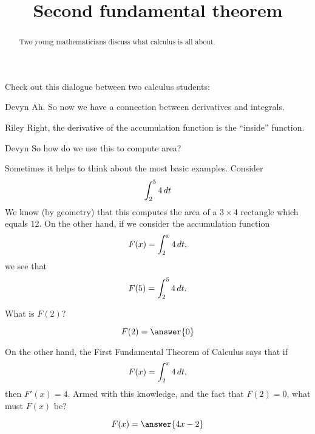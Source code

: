 \documentclass{ximera}
\title[Break-Ground:]{Second fundamental theorem}
\begin{document}
\begin{abstract}
Two young mathematicians discuss what calculus is all about.
\end{abstract}
\maketitle

Check out this dialogue between two calculus students:

\begin{dialogue}
\item[Devyn] Ah. So now we have a connection between derivatives and
  integrals.
\item[Riley] Right, the derivative of the accumulation function is the
  ``inside'' function.
\item[Devyn] So how do we use this to compute area?
\end{dialogue}

Sometimes it helps to think about the most basic examples. Consider
\[
\int_2^5 4 \,d t
\]
We know (by geometry) that this computes the area of a $3\times 4$
rectangle which equals $12$. On the other hand, if we consider the
accumulation function
\[
F(x) = \int_2^x 4 \,d t,
\]
we see that
\[
F(5) = \int_2^5 4 \,d t.
\]
\begin{problem}
  What is $F(2)$?
  \begin{prompt}
    \[
    F(2) = \answer{0}
    \]
  \end{prompt}
\end{problem}

\begin{problem}
  On the other hand, the First Fundamental Theorem of Calculus says that if
  \[
  F(x) = \int_2^x 4 \,d t,
  \]
  then $F'(x) = 4$. Armed with this knowledge, and the fact that $F(2)
  = 0$, what must $F(x)$ be?
  \begin{prompt}
    \[
    F(x) = \answer{4x-2}
    \]
  \end{prompt}
\end{problem}






\end{document}
